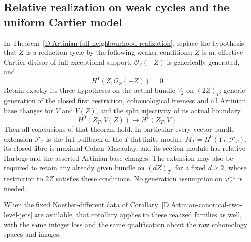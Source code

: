 \subsection{Relative realization on weak cycles and the uniform Cartier model}

\begin{proposition}
\label{D:weak-cycle-Artinian-full-realization}
In Theorem~\ref{D:Artinian-full-neighbourhood-realization}, replace
the hypothesis that $Z$ is a reduction cycle by the following
weaker conditions: $Z$ is an effective Cartier divisor of full
exceptional support, $\mathcal O_Z(-Z)$ is generically generated,
and
\[
                     H^1(Z,\mathcal O_Z(-Z))=0.
                                                        \tag{D.WR.1}
\]
Retain exactly its three hypotheses on the actual bundle $V_2$
on $(2Z)_T$: generic generation of the closed first restriction,
cohomological freeness and all Artinian base changes for $V$
and $V(Z)$, and the split injectivity of its actual boundary
\[
 H^0(Z_T,V(Z))\longrightarrow H^1(Z_T,V).
                                                        \tag{D.WR.2}
\]
Then all conclusions of that theorem hold. In particular every
vector-bundle extension $\mathcal F_T$ is the full pullback of
the $T$-flat finite module $M_T=H^0(Y_T,\mathcal F_T)$, its
closed fibre is maximal Cohen--Macaulay, and its section module
has relative Hartogs and the asserted Artinian base changes.
The extension may also be required to retain any already given
bundle on $(dZ)_T$, for a fixed $d\ge2$, whose restriction to
$2Z$ satisfies these conditions. No generation assumption on
$\omega_Z^{-1}$ is needed.

When the fixed Noether-different data of
Corollary~\ref{D:Artinian-canonical-two-level-jets} are available,
that corollary applies to these realized families as well,
with the same integer loss and the same qualification about
the raw cohomology spaces and images.
\end{proposition}

